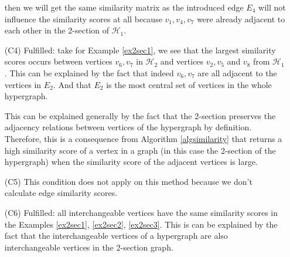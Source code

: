 \documentclass[a4paper,11pt]{report}
\newcommand{\hgrafeen}{\mathcal{H}}
\begin{document}
\begin{itemize}
\begin{center}
\end{center}
then we will get the same similarity matrix as the introduced edge $E_4$ will not influence the similarity scores at all 
because $v_1, v_4, v_7$ were already adjacent to each other in the 2-section of 
$\hgrafeen_1$. 

  \item[(C4)] Fulfilled: take for Example \ref{ex2sec1}, we see that the largest similarity scores
  occurs between vertices $v_6, v_7$ 
  in $\hgrafeen_2$ and vertices $v_2, v_5$ and $v_8$ from $\hgrafeen_1$. This can 
  be explained by the fact that indeed $v_6,v_7$ are all adjacent to the vertices in $E_2$. And that $E_2$ is the 
  most central set of vertices in the whole hypergraph. 
  
  This can be explained 
  generally by the fact that the 2-section preserves the adjacency relations between 
  vertices of the hypergraph by definition. Therefore, this is a consequence 
  from Algorithm \ref{algsimilarity} that returns a high similarity score of a 
  vertex in a graph (in this case the 2-section of the hypergraph) when the similarity score of the adjacent vertices is large.
    \item[(C5)] This condition does not apply on this method because we don't calculate edge similarity scores.
   \item[(C6)] Fulfilled: all interchangeable vertices have the same similarity 
   scores in the Examples \ref{ex2sec1}, \ref{ex2sec2}, \ref{ex2sec3}. This is can be explained
   by the fact that the interchangeable vertices of a hypergraph are also 
   interchangeable vertices in the 2-section graph.
   

\end{itemize}
\end{document}
